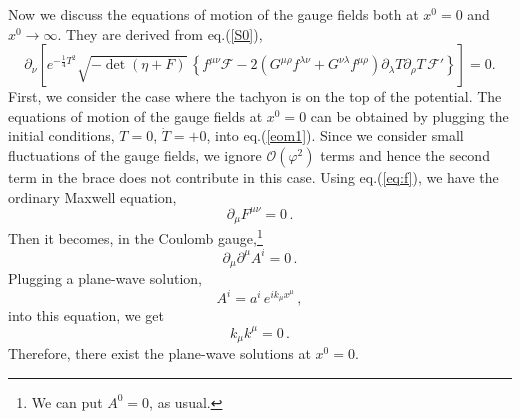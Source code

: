\documentclass[12pt,a4paper]{article}
\newcommand{\p}{\partial}
\newcommand{\F}{\mathcal{F}}
\newcommand{\VT}{e^{-\frac{1}{4} T^2}}
\newcommand{\calO}{\mathcal{O}}
\begin{document}
Now we discuss the equations of motion of the gauge fields both at
$x^0=0$ and $x^0 \to \infty$. They are derived from eq.(\ref{S0}),
\begin{equation}
\p_\nu \left[ \VT \sqrt{-\det(\eta+F)}\,\left\{
	f^{\mu\nu}\F - 2 \left( G^{\mu\rho} f^{\lambda\nu} +
	G^{\nu\lambda} f^{\mu\rho}\right) \p_\lambda T\p_\rho T
	\,\F'\right\}\right]=0. \label{eom1}
\end{equation}
First, we consider the case where the tachyon is on the top of the
potential. The equations of motion of the gauge fields at $x^0=0$ can
be obtained by plugging the initial conditions, $T=0$, $\dot{T}=+0$,
into eq.(\ref{eom1}). Since we consider small fluctuations of the
gauge fields, we ignore $\calO(\varphi^2)$ terms and hence the
second term in the brace does not contribute in this case.
Using eq.(\ref{eq:f}), we have the ordinary Maxwell equation,
\begin{equation}
	\p_\mu F^{\mu\nu}=0\,.
\end{equation}
Then it becomes, in the Coulomb gauge,\footnote{We can put $A^0=0$,
as usual.}
\begin{equation}
	\p_\mu \p^\mu A^i =0\,.
\end{equation}
Plugging a plane-wave solution,
\begin{equation}
	A^i=a^i\, e^{ik_\mu x^\mu}\,, \label{pwave}
\end{equation}
into this equation, we get
\begin{equation}
	k_\mu k^\mu =0\,.
\end{equation}
Therefore, there exist the plane-wave solutions at $x^0=0$.
\end{document}

